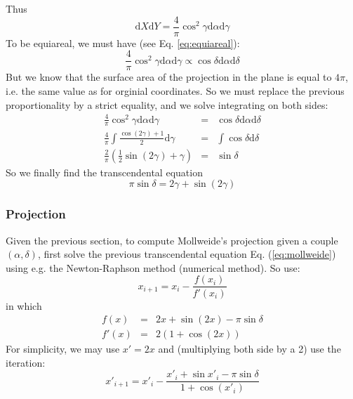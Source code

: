   Thus
  \begin{equation*}
    \mathrm{d}X\mathrm{d}Y = \frac{4}{\pi}\cos^2\gamma \mathrm{d}\alpha\mathrm{d}\gamma
  \end{equation*}
  To be equiareal, we must have (see Eq. \ref{eq:equiareal}):
  \begin{equation*}
    \frac{4}{\pi}\cos^2\gamma \mathrm{d}\alpha\mathrm{d}\gamma \propto \cos\delta\mathrm{d}\alpha\mathrm{d}\delta
  \end{equation*}
  But we know that the surface area of the projection in the plane is equal to $4\pi$, i.e. 
  the same value as for orginial coordinates.
  So we must replace the previous proportionality by a strict equality,
  and we solve integrating on both sides:
  \begin{eqnarray*}
    \frac{4}{\pi}\cos^2\gamma \mathrm{d}\alpha\mathrm{d}\gamma & = & \cos\delta\mathrm{d}\alpha\mathrm{d}\delta \\
    \frac{4}{\pi} \int \frac{\cos(2\gamma) + 1}{2}\mathrm{d}\gamma & = & \int \cos\delta\mathrm{d}\delta \\
    \frac{2}{\pi} (\frac{1}{2}\sin(2\gamma) + \gamma) & = & \sin\delta
  \end{eqnarray*} 
  So we finally find the transcendental equation
  \begin{equation}
    \pi \sin\delta = 2\gamma + \sin(2\gamma)
    \label{eq:mollweide}
  \end{equation}

  \subsubsection{Projection}

    Given the previous section, to compute Mollweide's projection given
    a couple $(\alpha, \delta)$, first solve the previous transcendental
    equation Eq. (\ref{eq:mollweide}) using e.g. the Newton-Raphson method (numerical method).
    So use:
    \begin{equation}
      x_{i+1} = x_i - \frac{f(x_i)}{f'(x_i)}
    \end{equation}
    in which
    \begin{eqnarray*}
      f(x) & = & 2x + \sin(2x) - \pi \sin\delta \\
     f'(x) & = & 2 (1 + \cos(2x)) %
    \end{eqnarray*}
    For simplicity, we may use $x'=2x$ and (multiplying both side by a 2)
    use the iteration:
    \begin{equation}
      x'_{i+1} = x'_i - \frac{x'_i + \sin x'_i - \pi \sin\delta}{1 + \cos(x'_i)}
    \end{equation}

